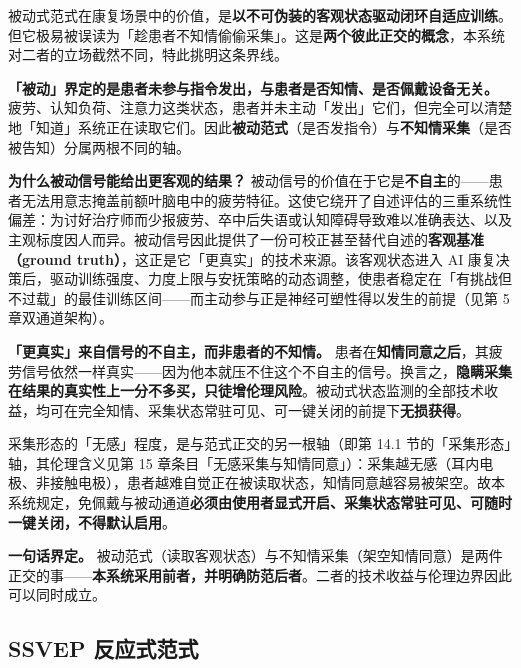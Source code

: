 \documentclass[11pt, a4paper]{ctexart}
\begin{document}
被动式范式在康复场景中的价值，是\textbf{以不可伪装的客观状态驱动闭环自适应训练}。但它极易被误读为「趁患者不知情偷偷采集」。这是\textbf{两个彼此正交的概念}，本系统对二者的立场截然不同，特此挑明这条界线。

\begin{keybox}
\textbf{「被动」界定的是患者未参与指令发出，与患者是否知情、是否佩戴设备无关。} 疲劳、认知负荷、注意力这类状态，患者并未主动「发出」它们，但完全可以清楚地「知道」系统正在读取它们。因此\textbf{被动范式}（是否发指令）与\textbf{不知情采集}（是否被告知）分属两根不同的轴。
\end{keybox}

\textbf{为什么被动信号能给出更客观的结果？} 被动信号的价值在于它是\textbf{不自主}的——患者无法用意志掩盖前额叶脑电中的疲劳特征。这使它绕开了自述评估的三重系统性偏差：为讨好治疗师而少报疲劳、卒中后失语或认知障碍导致难以准确表达、以及主观标度因人而异。被动信号因此提供了一份可校正甚至替代自述的\textbf{客观基准（ground truth）}，这正是它「更真实」的技术来源。该客观状态进入 AI 康复决策后，驱动训练强度、力度上限与安抚策略的动态调整，使患者稳定在「有挑战但不过载」的最佳训练区间——而主动参与正是神经可塑性得以发生的前提（见第 5 章双通道架构）。

\begin{warnbox}
\textbf{「更真实」来自信号的不自主，而非患者的不知情。} 患者在\textbf{知情同意之后}，其疲劳信号依然一样真实——因为他本就压不住这个不自主的信号。换言之，\textbf{隐瞒采集在结果的真实性上一分不多买，只徒增伦理风险}。被动式状态监测的全部技术收益，均可在完全知情、采集状态常驻可见、可一键关闭的前提下\textbf{无损获得}。
\end{warnbox}

采集形态的「无感」程度，是与范式正交的另一根轴（即第 14.1 节的「采集形态」轴，其伦理含义见第 15 章条目「无感采集与知情同意」）：采集越无感（耳内电极、非接触电极），患者越难自觉正在被读取状态，知情同意越容易被架空。故本系统规定，免佩戴与被动通道\textbf{必须由使用者显式开启、采集状态常驻可见、可随时一键关闭，不得默认启用}。

\begin{keybox}
\textbf{一句话界定。} 被动范式（读取客观状态）与不知情采集（架空知情同意）是两件正交的事——\textbf{本系统采用前者，并明确防范后者}。二者的技术收益与伦理边界因此可以同时成立。
\end{keybox}

\subsection{SSVEP 反应式范式}
\end{document}
